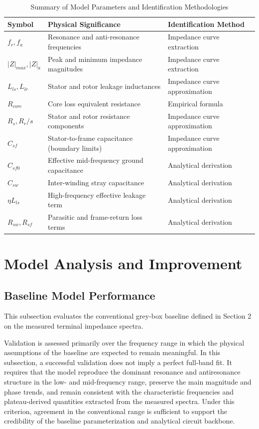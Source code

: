 \documentclass[12pt,a4paper]{article}
\begin{document}
\begin{table}[htbp]
\caption{Summary of Model Parameters and Identification Methodologies}
\label{tab:parameter_summary_final}
\centering
\begin{tabularx}{\columnwidth}{@{}l>{\raggedright\arraybackslash}X>{\raggedright\arraybackslash}X@{}}
\toprule
\textbf{Symbol} & \textbf{Physical Significance} & \textbf{Identification Method} \\ \midrule
$f_r, f_a$ & Resonance and anti-resonance frequencies & Impedance curve extraction \\
$|Z|_{max}, |Z|_{a}$ & Peak and minimum impedance magnitudes & Impedance curve extraction \\ \midrule
$L_{ls}, L_{lr}$ & Stator and rotor leakage inductances & Impedance curve approximation \\
$R_{core}$ & Core loss equivalent resistance & Empirical formula \\
$R_s, R_r/s$ & Stator and rotor resistance components & Impedance curve approximation \\ \midrule
$C_{sf}$ & Stator-to-frame capacitance (boundary limits) & Impedance curve approximation \\
$C_{sf0}$ & Effective mid-frequency ground capacitance & Analytical derivation \\
$C_{sw}$ & Inter-winding stray capacitance & Analytical derivation \\
$\eta L_{ls}$ & High-frequency effective leakage term & Analytical derivation \\
$R_{sw}, R_{sf}$ & Parasitic and frame-return loss terms & Analytical derivation \\ \bottomrule
\end{tabularx}
\end{table}

\section{Model Analysis and Improvement}

\subsection{Baseline Model Performance}

This subsection evaluates the conventional grey-box baseline defined in Section 2 on the measured terminal impedance spectra. 

Validation is assessed primarily over the frequency range in which the physical assumptions of the baseline are expected to remain meaningful. In this subsection, a successful validation does not imply a perfect full-band fit. It requires that the model reproduce the dominant resonance and antiresonance structure in the low- and mid-frequency range, preserve the main magnitude and phase trends, and remain consistent with the characteristic frequencies and plateau-derived quantities extracted from the measured spectra. Under this criterion, agreement in the conventional range is sufficient to support the credibility of the baseline parameterization and analytical circuit backbone.
\end{document}
